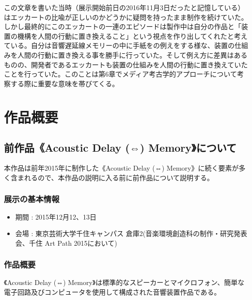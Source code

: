 \documentclass[a4paper,report]{jsbook}
\begin{document}
この文章を書いた当時（展示開始前日の2016年11月3日だったと記憶している）はエッカートの比喩が正しいのかどうかに疑問を持ったまま制作を続けていた。しかし最終的にこのエッカートの一連のエピソードは製作中は自分の作品と「装置の機構を人間の行動に置き換えること」という視点を作り出してくれたと考えている。自分は音響遅延線メモリーの中に手紙をの例えをする様な、装置の仕組みを人間の行動に置き換える事を勝手に行っていた。そして例え方に差異はあるものの、開発者であるエッカートも装置の仕組みを人間の行動に置き換えていたことを行っていた。このことは第6章でメディア考古学的アプローチについて考察する際に重要な意味を帯びてくる。

\chapter{作品概要}\label{ux4f5cux54c1ux6982ux8981}

\section{前作品《Acoustic Delay (⇔)
Memory》について}\label{ux524dux4f5cux54c1acoustic-delay-memoryux306bux3064ux3044ux3066}

本作品は前年2015年に制作した《Acoustic Delay (⇔)
Memory》に続く要素が多く含まれるので、本作品の説明に入る前に前作品について説明する。

\subsection{展示の基本情報}\label{ux5c55ux793aux306eux57faux672cux60c5ux5831}

\begin{itemize}
\tightlist
\item
  期間 : 2015年12月12、13日
\item
  会場 : 東京芸術大学千住キャンパス
  倉庫2(音楽環境創造科の制作・研究発表会、千住 Art Path 2015において)
\end{itemize}

\subsection{作品概要}\label{ux4f5cux54c1ux6982ux8981-1}

《Acoustic Delay (⇔)
Memory》は標準的なスピーカーとマイクロフォン、簡単な電子回路及びコンピュータを使用して構成された音響装置作品である。
\end{document}
